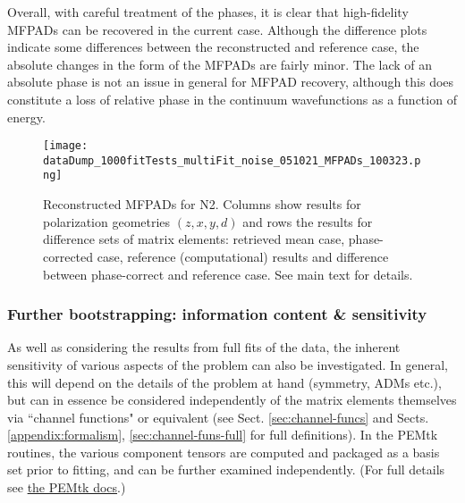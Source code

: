\documentclass[10pt]{article}
\begin{document}
Overall, with careful treatment of the phases, it is clear that high-fidelity MFPADs can be recovered in the current case. Although the difference plots indicate some differences between the reconstructed and reference case, the absolute changes in the form of the MFPADs are fairly minor. The lack of an absolute phase is not an issue in general for MFPAD recovery, although this does constitute a loss of relative phase in the continuum wavefunctions as a function of energy. %


\begin{figure}[]
\begin{center}
\texttt{[image: dataDump\_1000fitTests\_multiFit\_noise\_051021\_MFPADs\_100323.png]}
\caption{Reconstructed MFPADs for N2. Columns show results for polarization geometries \((z,x,y,d)\) and rows the results for difference sets of matrix elements: retrieved mean case, phase-corrected case, reference (computational) results and difference between phase-correct and reference case. See main text for details.\label{454268}}
\end{center}
\end{figure}

\subsubsection{Further bootstrapping: information content \& sensitivity\label{sec:bootstrapping-info-sensitivity}}

As well as considering the results from full fits of the data, the inherent sensitivity of various aspects of the problem can also be investigated. In general, this will depend on the details of the problem at hand (symmetry, ADMs etc.), but can in essence be considered independently of the matrix elements themselves via ``channel functions" or equivalent (see Sect. \ref{sec:channel-funcs} and Sects. \ref{appendix:formalism}, \ref{sec:channel-funs-full} for full definitions). In the PEMtk routines, the various component tensors are computed and packaged as a basis set prior to fitting, and can be further examined independently. (For full details see \href{https://pemtk.readthedocs.io/en/latest/fitting/PEMtk_fitting_basis-set_demo_050621-full.html}{the PEMtk docs}.)
\end{document}
